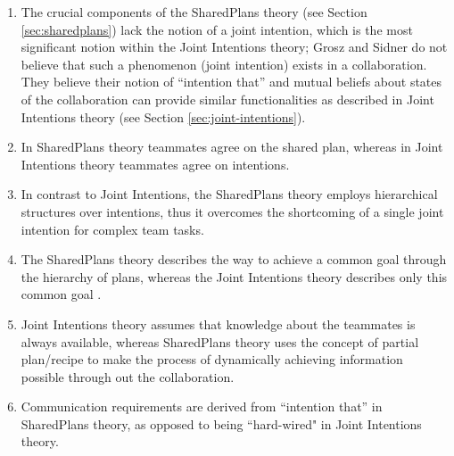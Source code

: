 \documentclass[12pt]{report}
\begin{document}
\begin{enumerate}
  \item The crucial components of the SharedPlans theory (see Section  
  \ref{sec:sharedplans}) lack the notion of a joint intention, which is the most
  significant notion within the Joint Intentions theory; Grosz and Sidner do not
  believe that such a phenomenon (joint intention) exists in a collaboration.
  They believe their notion of ``intention that'' and mutual beliefs about
  states of the collaboration can provide similar functionalities as described
  in Joint Intentions theory (see Section \ref{sec:joint-intentions}).
  
  \item In SharedPlans theory teammates agree on the shared plan, whereas in
  Joint Intentions theory teammates agree on intentions.
  
  \item In contrast to Joint Intentions, the SharedPlans theory employs
  hierarchical structures over intentions, thus it overcomes the shortcoming of
  a single joint intention for complex team tasks.
  
  \item The SharedPlans theory describes the way to achieve a common goal
  through the hierarchy of plans, whereas the Joint Intentions theory describes
  only this common goal \cite{skubch:modelling-behavior-robots}.
  
  \item Joint Intentions theory assumes that knowledge about the teammates is
  always available, whereas SharedPlans theory uses the concept of partial
  plan/recipe to make the process of dynamically achieving information possible
  through out the collaboration.
  
  \item Communication requirements are derived from ``intention that'' in
  SharedPlans theory, as opposed to being ``hard-wired" in Joint Intentions
  theory.
\end{enumerate}
\end{document}
